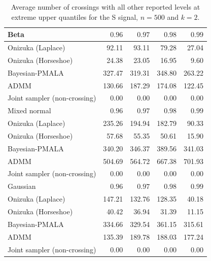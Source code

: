\begin{table}[!htbp]
\centering
\small
\caption{Average number of crossings with all other reported levels at extreme upper quantiles for the S signal, $n=500$ and $k=2$.}
\label{tab:s_ext_upper_cross_all}
\begin{tabular}{lrrrr}
\toprule
Beta & $0.96$ & $0.97$ & $0.98$ & $0.99$ \\
\midrule
Onizuka (Laplace) & 92.11 & 93.11 & 79.28 & 27.04 \\
Onizuka (Horseshoe) & 24.38 & 23.05 & 16.95 & 9.60 \\
Bayesian-PMALA & 327.47 & 319.31 & 348.80 & 263.22 \\
ADMM & 130.66 & 187.29 & 174.08 & 122.45 \\
Joint sampler (non-crossing) & 0.00 & 0.00 & 0.00 & 0.00 \\
\midrule
Mixed normal & $0.96$ & $0.97$ & $0.98$ & $0.99$ \\
\midrule
Onizuka (Laplace) & 235.26 & 194.94 & 182.79 & 90.33 \\
Onizuka (Horseshoe) & 57.68 & 55.35 & 50.61 & 15.90 \\
Bayesian-PMALA & 340.20 & 346.37 & 389.56 & 341.03 \\
ADMM & 504.69 & 564.72 & 667.38 & 701.93 \\
Joint sampler (non-crossing) & 0.00 & 0.00 & 0.00 & 0.00 \\
\midrule
Gaussian & $0.96$ & $0.97$ & $0.98$ & $0.99$ \\
\midrule
Onizuka (Laplace) & 147.21 & 132.76 & 128.35 & 40.18 \\
Onizuka (Horseshoe) & 40.42 & 36.94 & 31.39 & 11.15 \\
Bayesian-PMALA & 334.66 & 329.54 & 361.15 & 315.61 \\
ADMM & 135.39 & 189.78 & 188.03 & 177.24 \\
Joint sampler (non-crossing) & 0.00 & 0.00 & 0.00 & 0.00 \\
\bottomrule
\end{tabular}
\end{table}
